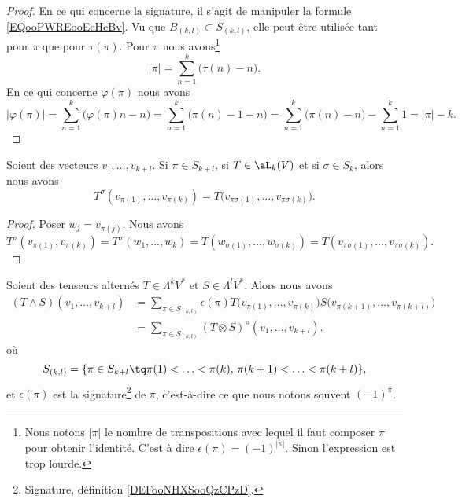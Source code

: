 \begin{proof}
	En ce qui concerne la signature, il s'agit de manipuler la formule \eqref{EQooPWREooEeHcBv}. Vu que \( B_{(k,l)}\subset S_{(k,l)}\), elle peut être utilisée tant pour \( \pi\) que pour \( \tau(\pi)\). Pour \( \pi\) nous avons\footnote{Nous notons \( | \pi |\) le nombre de transpositions avec lequel il faut composer \( \pi\) pour obtenir l'identité. C'est à dire \( \epsilon(\pi)=(-1)^{| \pi |}\). Sinon l'expression est trop lourde.}
	\begin{equation}
		| \pi |=\sum_{n=1}^k\big( \tau(n)-n \big).
	\end{equation}
	En ce qui concerne \( \varphi(\pi)\) nous avons
	\begin{equation}
		| \varphi(\pi) |=\sum_{n=1}^k\big( \varphi(\pi)n-n \big)=\sum_{n=1}^k\big( \pi(n)-1-n \big)=\sum_{n=1}^k\big( \pi(n)-n \big)-\sum_{n=1}^k1=| \pi |-k.
	\end{equation}
\end{proof}

\begin{lemma}		\label{LEMooRKWHooBNxZBL}
	Soient des vecteurs \( v_1,\ldots,v_{k+l}\). Si \(\pi \in S_{k+l} \), si \( T\in \aL_k(V)\) et si \( \sigma\in S_k\), alors nous avons
	\begin{equation}		\label{EQooQJXHooTfvclD}
		T^{\sigma}(v_{\pi(1)},\ldots,v_{\pi(k)})=T\big( v_{\pi\sigma(1)},\ldots,v_{\pi\sigma(k)} \big).
	\end{equation}
\end{lemma}

\begin{proof}
	Poser \( w_j=v_{\pi(j)}\). Nous avons
	\begin{equation}
		T^{\sigma}(v_{\pi(1)}, v_{\pi(k)})=T^{\sigma}(w_1,\ldots,w_k)=T(w_{\sigma(1)},\ldots,w_{\sigma(k)})=T(v_{\pi\sigma(1)},\ldots,v_{\pi\sigma(k)}).
	\end{equation}
\end{proof}

\begin{lemma}		\label{LEMooTGNUooZnxkrc}
	Soient des tenseurs alternés \( T\in\Lambda^kV^*\) et \( S\in \Lambda^lV^*\). Alors nous avons
	\begin{subequations}
		\begin{align}
			(T\wedge S)(v_1,\ldots, v_{k+l}) & =\sum_{\pi\in S_{(k,l)}}\epsilon(\pi)T\big( v_{\pi(1)},\ldots,v_{\pi(k)} \big)S\big( v_{\pi(k+1)},\ldots, v_{\pi(k+l)} \big) \\
			                                 & =\sum_{\pi\in S_{(k,l)}}(T\otimes S)^{\pi}(v_1,\ldots,v_{k+l}).		\label{SUBEQooUDLIooWwGFoe}
		\end{align}
	\end{subequations}
	où
	\begin{equation}
		S_{(k,l)}=\{ \pi\in S_{k+l}\tq \pi(1)<\ldots <\pi(k),\,\pi(k+1)<\ldots <\pi(k+l) \},
	\end{equation}
	et \( \epsilon(\pi)\) est la signature\footnote{Signature, définition \ref{DEFooNHXSooQzCPzD}.} de \( \pi\), c'est-à-dire ce que nous notons souvent \( (-1)^{\pi}\).
\end{lemma}

